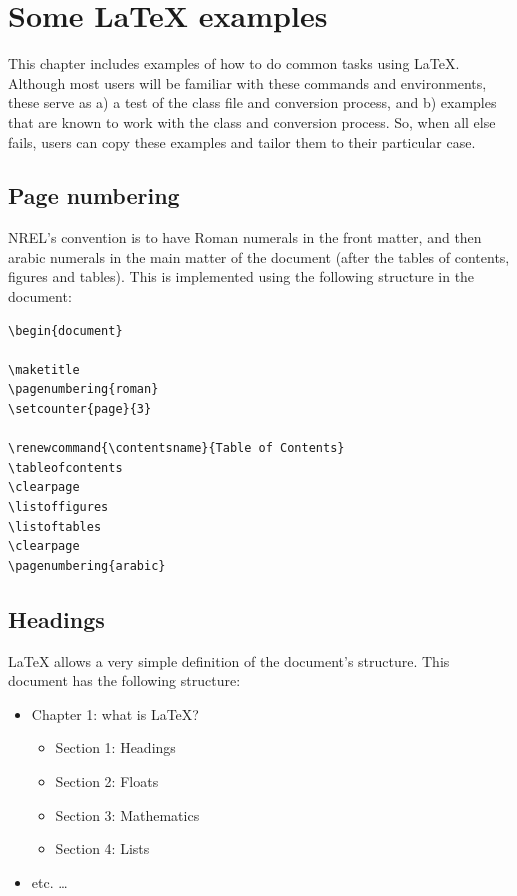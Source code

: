 \documentclass[12pt,letterpaper]{report}
\begin{document}
\chapter{Some LaTeX examples}
This chapter includes examples of how to do common tasks using \LaTeX{}. Although most users will be familiar with these commands and environments, these serve as a) a test of the class file and conversion process, and b) examples that are known to work with the class and conversion process. So, when all else fails, users can copy these examples and tailor them to their particular case.

\section{Page numbering}
NREL's convention is to have Roman numerals in the front matter, and then arabic numerals in the main matter of the document (after the tables of contents, figures and tables). This is implemented using the following structure in the document:

\begin{verbatim}
\begin{document}

\maketitle
\pagenumbering{roman}
\setcounter{page}{3}

\renewcommand{\contentsname}{Table of Contents}
\tableofcontents
\clearpage
\listoffigures
\listoftables
\clearpage
\pagenumbering{arabic}
\end{verbatim}

\section{Headings}
\LaTeX{} allows a very simple definition of the document's structure. This document has the following structure:
\begin{itemize}
\item Chapter 1: what is \LaTeX?
\begin{itemize}
\item Section 1: Headings
\item Section 2: Floats
\item Section 3: Mathematics
\item Section 4: Lists
\end{itemize}
\item etc. \ldots
\end{itemize}
\end{document}
